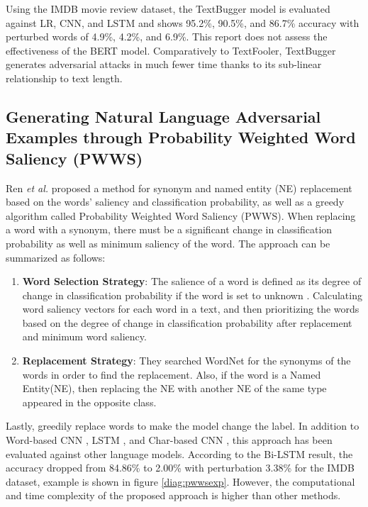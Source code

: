 \documentclass[%
	BCOR=8mm, %
	DIV=12,
	toc=bibliography, %
	toc=listof, %
	oneside, %
	egregdoesnotlikesansseriftitles, %
	]{scrbook}
\begin{document}
Using the IMDB movie review dataset, the TextBugger model is evaluated against LR, CNN, and LSTM and shows 95.2\%, 90.5\%, and 86.7\% accuracy with perturbed words of 4.9\%, 4.2\%, and 6.9\%. This report does not assess the effectiveness of the BERT model. Comparatively to TextFooler, TextBugger generates adversarial attacks in much fewer time thanks to its sub-linear relationship to text length.

\subsection{Generating Natural Language Adversarial Examples through Probability Weighted Word Saliency (PWWS)}
\label{subsection:generatingadversarialexample}
Ren \textit{et al.} \cite{ren_generating_2019} proposed a method for synonym and named entity (NE) replacement based on the words' saliency and classification probability, as well as a greedy algorithm called Probability Weighted Word Saliency (PWWS). When replacing a word with a synonym, there must be a significant change in classification probability as well as minimum saliency of the word. The approach can be summarized as follows:

\begin{enumerate}
    \item \textbf{Word Selection Strategy}:  
   The salience of a word is defined as its degree of change in classification probability if the word is set to unknown \cite{li_understanding_2017}. Calculating word saliency vectors for each word in a text, and then prioritizing the words based on the degree of change in classification probability after replacement and minimum word saliency.
    \item \textbf{Replacement Strategy}: They searched WordNet for the synonyms of the words in order to find the replacement. Also, if the word is a Named Entity(NE), then replacing the NE with another NE of the same type appeared in the opposite class.
\end{enumerate}
Lastly, greedily replace words to make the model change the label. In addition to Word-based CNN \cite{kim_convolutional_2014},  LSTM \cite{hochreiter_long_1997},  and Char-based CNN \cite{zhang_character-level_2016}, this approach has been evaluated against other language models. According to the Bi-LSTM result, the accuracy dropped from 84.86\% to 2.00\% with perturbation 3.38\% for the IMDB dataset, example is shown in figure \ref{diag:pwwsexp}. However, the computational and time complexity of the proposed approach is higher than other methods.
\end{document}

